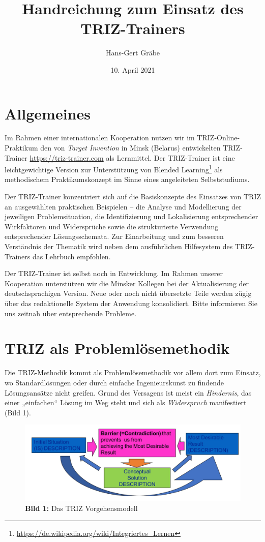 \documentclass[11pt,a4paper]{article}
\title{Handreichung zum Einsatz des TRIZ-Trainers}
\author{Hans-Gert Gr\"abe}
\date{10. April 2021}
\begin{document}
\maketitle
\tableofcontents
\newpage

\section{Allgemeines}

Im Rahmen einer internationalen Kooperation nutzen wir im
TRIZ-Online-Praktikum den von \emph{Target Invention} in Minsk (Belarus)
entwickelten TRIZ-Trainer \url{https://triz-trainer.com} als Lernmittel.  Der
TRIZ-Trainer ist eine leichtgewichtige Version zur Unterstützung von Blended
Learning\footnote{\url{https://de.wikipedia.org/wiki/Integriertes_Lernen}} als
methodischem Praktikumskonzept im Sinne eines angeleiteten Selbststudiums.

Der TRIZ-Trainer konzentriert sich auf die Basiskonzepte des Einsatzes von
TRIZ an ausgewählten praktischen Beispielen -- die Analyse und Modellierung
der jeweiligen Problemsituation, die Identifizierung und Lokalisierung
entsprechender Wirkfaktoren und Widersprüche sowie die strukturierte
Verwendung entsprechender Lösungsschemata.  Zur Einarbeitung und zum besseren
Verständnis der Thematik wird neben dem ausführlichen Hilfesystem des
TRIZ-Trainers das Lehrbuch \cite{KS2017} empfohlen.

Der TRIZ-Trainer ist selbst noch in Entwicklung.  Im Rahmen unserer
Kooperation unterstützen wir die Minsker Kollegen bei der Aktualisierung der
deutschsprachigen Version.  Neue oder noch nicht übersetzte Teile werden zügig
über das redaktionelle System der Anwendung konsolidiert.  Bitte informieren
Sie uns zeitnah über entsprechende Probleme.

\section{TRIZ als Problemlösemethodik}

Die TRIZ-Methodik kommt als Problemlösemethodik vor allem dort zum Einsatz, wo
Standardlösungen oder durch einfache Ingenieurskunst zu findende
Lösungsansätze nicht greifen.  Grund des Versagens ist meist ein
\emph{Hindernis}, das einer „einfachen“ Lösung im Weg steht und sich als
\emph{Widerspruch} manifestiert (Bild 1). 

\begin{figure}[ht]\centering
    \includegraphics[width=.8\textwidth]{Basics.png}\\
    \textbf{Bild 1:} Das TRIZ Vorgehensmodell
\end{figure}
\end{document}
